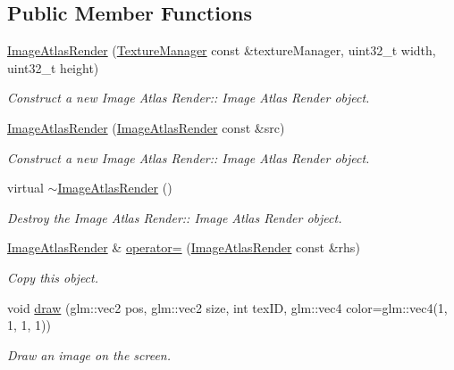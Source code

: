 \subsection*{Public Member Functions}
\begin{DoxyCompactItemize}
\item 
\hyperlink{class_image_atlas_render_a0ae44d3e6a32ca9c6c1134a48bf882ad}{Image\+Atlas\+Render} (\hyperlink{class_texture_manager}{Texture\+Manager} const \&texture\+Manager, uint32\+\_\+t width, uint32\+\_\+t height)
\begin{DoxyCompactList}\small\item\em Construct a new Image Atlas Render\+:\+: Image Atlas Render object. \end{DoxyCompactList}\item 
\hyperlink{class_image_atlas_render_a32e495960aaf9c0945c3dcebe5467f6f}{Image\+Atlas\+Render} (\hyperlink{class_image_atlas_render}{Image\+Atlas\+Render} const \&src)
\begin{DoxyCompactList}\small\item\em Construct a new Image Atlas Render\+:\+: Image Atlas Render object. \end{DoxyCompactList}\item 
\mbox{\label{class_image_atlas_render_a6041bd00a0a0fe26deeec02354778ae1}} 
virtual \hyperlink{class_image_atlas_render_a6041bd00a0a0fe26deeec02354778ae1}{$\sim$\+Image\+Atlas\+Render} ()
\begin{DoxyCompactList}\small\item\em Destroy the Image Atlas Render\+:\+: Image Atlas Render object. \end{DoxyCompactList}\item 
\hyperlink{class_image_atlas_render}{Image\+Atlas\+Render} \& \hyperlink{class_image_atlas_render_a069c9bdf26534ddc159545eb27186745}{operator=} (\hyperlink{class_image_atlas_render}{Image\+Atlas\+Render} const \&rhs)
\begin{DoxyCompactList}\small\item\em Copy this object. \end{DoxyCompactList}\item 
void \hyperlink{class_image_atlas_render_a62a3811954993e291ea33a0f818fed49}{draw} (glm\+::vec2 pos, glm\+::vec2 size, int tex\+ID, glm\+::vec4 color=glm\+::vec4(1, 1, 1, 1))
\begin{DoxyCompactList}\small\item\em Draw an image on the screen. \end{DoxyCompactList}\item 

\end{DoxyCompactItemize}
